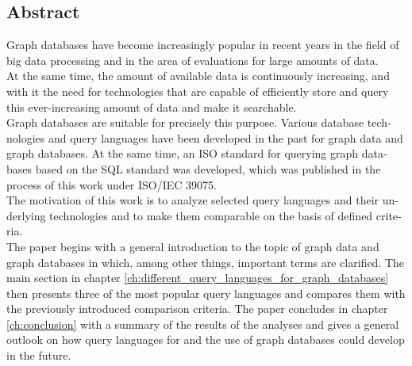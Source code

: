 

\begin{otherlanguage}{american}
	\chapter*{Abstract}
	Graph databases have become increasingly popular in recent years in the field of big data processing and in the area of 
	evaluations for large amounts of data.\\
	At the same time, the amount of available data is continuously increasing, and with it the need for technologies that are capable of
	efficiently store and query this ever-increasing amount of data and make it searchable.\\
	Graph databases are suitable for precisely this purpose.
	Various database technologies and query languages have been developed in the past for graph data and graph databases. At the same time, 
	an ISO standard for querying graph databases based on the \ac{SQL} standard was developed, 
	which was published in the process of this work under ISO/IEC 39075.\\ 
	The motivation of this work is to analyze selected query languages 
	and their underlying technologies and to make them comparable on the basis of defined criteria.\\ 
	The paper begins with a general introduction to the topic of graph data and graph databases in which, 
	among other things, important terms are clarified.
	The main section in chapter \ref{ch:different_query_languages_for_graph_databases} then presents three of the most popular query languages and 
	compares them with the previously introduced comparison criteria. 
	The paper concludes in chapter \ref{ch:conclusion} with
	a summary of the results of the analyses and gives a general outlook on how query languages 
	for and the use of graph databases could develop in the future.

\end{otherlanguage}
